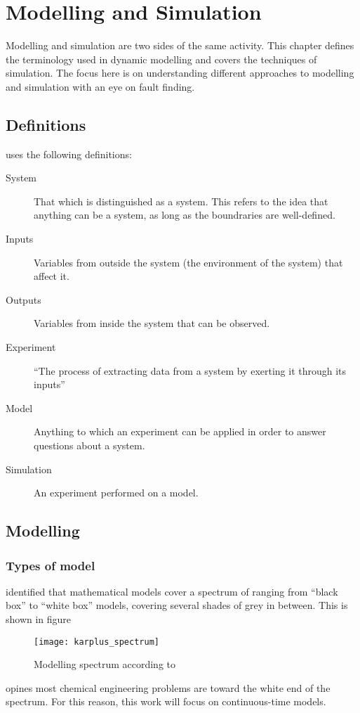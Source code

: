 \chapter{Modelling and Simulation}

\begin{overview}
Modelling and simulation are two sides of the same activity.
This chapter defines the terminology used in dynamic modelling and covers the techniques of simulation.
The focus here is on understanding different approaches to modelling and simulation with an eye on fault finding.
\end{overview}

\section{Definitions}
\citet[4--10]{cellier1991continuous} uses the following definitions:  
\begin{description}
\item[System] That which is distinguished as a system.  
This refers to the idea that anything can be a system, as long as the boundraries are well-defined.
\item[Inputs] Variables from outside the system (the environment of the system) that affect it.
\item[Outputs] Variables from inside the system that can be observed.
\item[Experiment] ``The process of extracting data from a system by exerting it through its inputs''
\item[Model] Anything to which an experiment can be applied in order to answer questions about a system.
\item[Simulation] An experiment performed on a model.
\end{description}

\section{Modelling}
\subsection{Types of model}
\citet{karplus1977spectrum} identified that mathematical models cover a spectrum of ranging from ``black box'' to ``white box'' models, covering several shades of grey in between.
This is shown in figure
\begin{figure}[htbp]
  \centering
  \texttt{[image: karplus\_spectrum]}
  \caption{Modelling spectrum according to~\citet{karplus1977spectrum}}
  \label{fig:karplusspectrum}
\end{figure}
\citet[15]{cellier1991continuous} opines most chemical engineering problems are toward the white end of the spectrum.
For this reason, this work will focus on continuous-time models.

